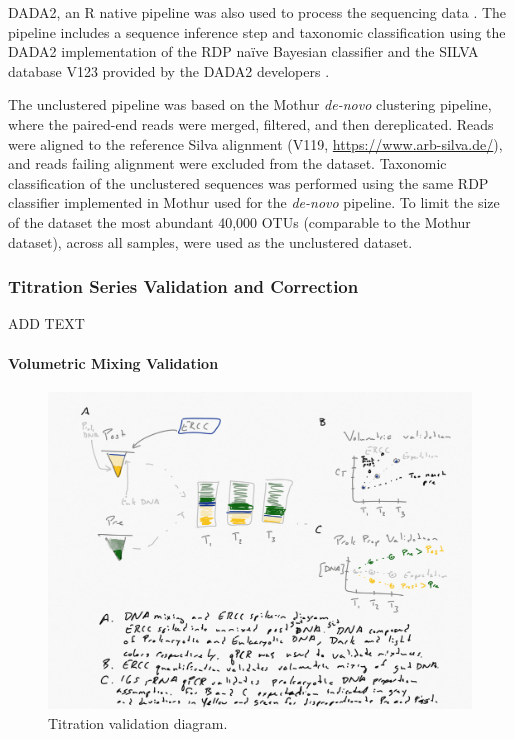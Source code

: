 \documentclass[linenumbers]{bmcart}
\begin{document}
DADA2, an R native pipeline was also used to process the sequencing data
\cite{callahan2016dada2}. The pipeline includes a sequence inference
step and taxonomic classification using the DADA2 implementation of the
RDP naïve Bayesian classifier \cite{wang2007naive} and the SILVA
database V123 provided by the DADA2 developers
\cite[\url{https://benjjneb.github.io/dada2/training.html}]{quast2012silva}.

The unclustered pipeline was based on the Mothur \emph{de-novo}
clustering pipeline, where the paired-end reads were merged, filtered,
and then dereplicated. Reads were aligned to the reference Silva
alignment (V119, \url{https://www.arb-silva.de/}), and reads failing
alignment were excluded from the dataset. Taxonomic classification of
the unclustered sequences was performed using the same RDP classifier
implemented in Mothur used for the \emph{de-novo} pipeline. To limit the
size of the dataset the most abundant 40,000 OTUs (comparable to the
Mothur dataset), across all samples, were used as the unclustered
dataset.

\subsubsection*{Titration Series Validation and Correction}
ADD TEXT

\paragraph*{Volumetric Mixing Validation}
\begin{figure}
\centering
\includegraphics{titration_validation.png}
\caption{\label{fig:titrationValidation} Titration validation diagram.}
\end{figure}
\end{document}
